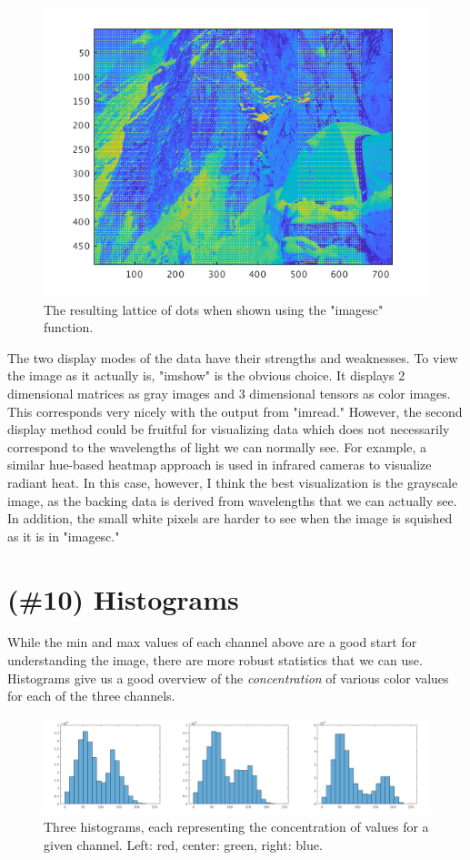 \documentclass{article}
\begin{document}
\begin{figure}[!ht]
	\centering
	\includegraphics[width=120mm]{figs/tent_white_dots_imagesc.png}
	\caption{The resulting lattice of dots when shown using the "imagesc" 
        function.}
\end{figure}

The two display modes of the data have their strengths and weaknesses. To view 
the image as it actually is, "imshow" is the obvious choice. It displays 2 
dimensional matrices as gray images and 3 dimensional tensors as color images. 
This corresponds very nicely with the output from "imread." However, the second 
display method could be fruitful for visualizing data which does not 
necessarily correspond to the wavelengths of light we can normally see. For 
example, a similar hue-based heatmap approach is used in infrared cameras to 
visualize radiant heat. In this case, however, I think the best visualization 
is the grayscale image, as the backing data is derived from wavelengths that we 
can actually see. In addition, the small white pixels are harder to see when 
the image is squished as it is in "imagesc."

\section{(\#10) Histograms}

While the min and max values of each channel above are a good start for 
understanding the image, there are more robust statistics that we can use. 
Histograms give us a good overview of the \textit{concentration} of various 
color values 
for each of the three channels.

\begin{figure}[!ht]
	\centering
	\includegraphics[width=160mm]{figs/hist_all.png}
	\caption{Three histograms, each representing the concentration of values for 
        a given channel. Left: red, center: green, right: blue.}
\end{figure}
\end{document}
